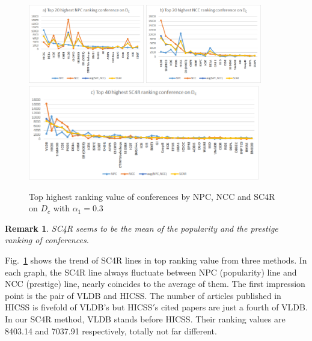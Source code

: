 \documentclass[10pt,leqno,twoside]{article}
\newtheorem{remark}{\indent Remark}[section]
\begin{document}
\begin{figure} %
	\caption{Top highest ranking value of conferences by NPC, NCC and SC4R on $D_c$ with $\alpha_1=0.3$}
	\label{Fig:Top20ConfDc}
    \centering
    \includegraphics[width=0.45\textwidth]{Dct20NPCc}
    \includegraphics[width=0.45\textwidth]{DCt20NCCc}
    \includegraphics[width=0.90\textwidth]{DCt40SC4Rc}   
\end{figure}
%
\begin{remark}
SC4R seems to be the mean of the popularity and the prestige ranking of conferences.
\end{remark}
Fig.~\ref{Fig:Top20ConfDc} shows the trend of SC4R lines in top ranking value from three methods. In each graph, the SC4R line always fluctuate between NPC (popularity) line and NCC (prestige) line, nearly coincides to the average of them. The first impression point is the pair of VLDB and HICSS. The number of articles published in HICSS is fivefold of VLDB's but HICSS$'$s cited papers are just a fourth of VLDB. In our SC4R method, VLDB stands before HICSS. Their ranking values are 8403.14 and 7037.91 respectively, totally not far different.
\end{document}
